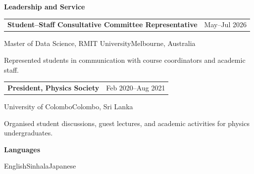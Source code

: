 \documentclass[10pt,a4paper]{article}
\makeatletter
\newcommand{\contactsep}{\hspace{0.55em}\textcolor{hairline}{\textbullet}\hspace{0.55em}}
\newcommand{\cvsection}[1]{%
  \par\vspace{0.78em}%
  {\sffamily\bfseries\color{accent}\fontsize{11.3}{13.2}\selectfont #1}\par
  \vspace{0.3em}}
\newcommand{\cventry}[3]{%
  \par\noindent
  \begin{tabularx}{\textwidth}{@{}>{\raggedright\arraybackslash}X
    >{\raggedleft\arraybackslash\sffamily\leavevmode\color{accent}}p{3.25cm}@{}}
    \textbf{#1} & {\small #2}
  \end{tabularx}\par\vspace{-0.08em}%
  {\small\sffamily\color{muted}#3}\par\vspace{0.12em}}
\newenvironment{cvitems}{%
  \begin{list}{\textcolor{accent}{\raisebox{0.15ex}{\scriptsize\textbullet}}}{%
    \setlength{\leftmargin}{1.18em}\setlength{\labelsep}{0.42em}%
    \setlength{\itemsep}{1.4pt}\setlength{\topsep}{2.2pt}%
    \setlength{\parsep}{0pt}\setlength{\partopsep}{0pt}}%
}{\end{list}}
\makeatother
\begin{document}
\cvsection{Leadership and Service}
\cventry{Student--Staff Consultative Committee Representative}{May--Jul 2026}
  {Master of Data Science, RMIT University\contactsep Melbourne, Australia}
\begin{cvitems}
  \item Represented students in communication with course coordinators and academic staff.
\end{cvitems}
\cventry{President, Physics Society}{Feb 2020--Aug 2021}
  {University of Colombo\contactsep Colombo, Sri Lanka}
\begin{cvitems}
  \item Organised student discussions, guest lectures, and academic activities
  for physics undergraduates.
\end{cvitems}

\cvsection{Languages}
English\contactsep Sinhala\contactsep Japanese
\end{document}
